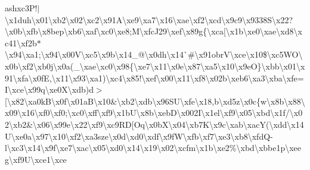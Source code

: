 \begin{DoxyCompactItemize}
ash{}xc3\+P!$\vert$\textbackslash{}x1duh\textbackslash{}x01\textbackslash{}xb2\textbackslash{}x02\textbackslash{}xc2\textbackslash{}x91\+A\textbackslash{}xe9\textbackslash{}xa7\textbackslash{}x16\textbackslash{}xae\textquotesingle{}\textbackslash{}xf2\textbackslash{}xcd\textbackslash{}x9c9\textbackslash{}x9338\+S\textbackslash{}x22?\textbackslash{}x0b\textbackslash{}xfb\textbackslash{}x8bep\textbackslash{}xb6\textbackslash{}xaf\textbackslash{}xc0\textbackslash{}xe8;\+M\textbackslash{}xfc\+J29\textbackslash{}xef\textbackslash{}x89g\{\textbackslash{}xca\mbox{[}\textbackslash{}x1b\textbackslash{}xe0\textbackslash{}xae\textbackslash{}xd8\textbackslash{}xc41\textbackslash{}xf2b$\ast$\textbackslash{}x94\textbackslash{}xa1;\textbackslash{}x94\textbackslash{}x00\+V\textbackslash{}xc5\textbackslash{}x9b\textbackslash{}x14\+\_\+@\textbackslash{}x0dh\textbackslash{}x14\`{}\#\textbackslash{}x91obr\+V\textbackslash{}xce\textbackslash{}x10\$\textbackslash{}xc5\+W\+O\textbackslash{}x0b\textbackslash{}xf2\textbackslash{}xb0j\textbackslash{}x0a(\+\_\+\textbackslash{}xae\textbackslash{}xc0\textbackslash{}x98\{\textbackslash{}xe7\textbackslash{}x11\textbackslash{}x0e\textbackslash{}x87\textbackslash{}xa5\textbackslash{}x10\textbackslash{}x9e\+O\}\textbackslash{}xbb\textbackslash{}x01\textbackslash{}x91\textbackslash{}xfa\textbackslash{}x0f\+E,\textbackslash{}x11\textbackslash{}x93\textbackslash{}xa1)\textbackslash{}xc4\textbackslash{}x85!\textbackslash{}xef\textbackslash{}x00\textbackslash{}x11\textbackslash{}xf8\textbackslash{}x02b\textbackslash{}xeb6\textbackslash{}xa3\textbackslash{}xba\textbackslash{}xfe=\+I\textbackslash{}xce\textbackslash{}x99q\textbackslash{}xe0\+X\textbackslash{}xdb)d$>$\mbox{[}\textbackslash{}x82\textbackslash{}xa0k\+B\textbackslash{}x0f\textbackslash{}x01a\+B\textbackslash{}x10\&\textbackslash{}xb2\textbackslash{}xdb\textbackslash{}x96\+S\+U\textbackslash{}xfe\textbackslash{}x18,b\textbackslash{}xd5z\textbackslash{}x0c\{w\textbackslash{}x8b\textbackslash{}x88\textbackslash{}x09\textbackslash{}x16\textbackslash{}xf0\textbackslash{}xf0;\textbackslash{}xc0\textbackslash{}xff\textbackslash{}xf9\textbackslash{}x1b\+U\textbackslash{}x8b\textbackslash{}xeb\+D\textbackslash{}x002\+I\textbackslash{}x1el\textbackslash{}xf9\textbackslash{}x05\textbackslash{}xbd\textbackslash{}x1f/\textbackslash{}x02\textbackslash{}xb2\&\textbackslash{}x06\textbackslash{}x99e\textbackslash{}x22\textbackslash{}xf9\textbackslash{}xc9\+R\+D\mbox{[}\+Oq\textbackslash{}x0b\+X\textbackslash{}x04\textbackslash{}xb7\+K\textbackslash{}x9c\textbackslash{}xab\textbackslash{}xac\+Y(\textbackslash{}xdd\textbackslash{}x14\+U\textbackslash{}xe0a\textbackslash{}x97\textbackslash{}x10\textbackslash{}xf2\textbackslash{}xa3sze\textbackslash{}x0d\textbackslash{}xd0\textbackslash{}xdf\textquotesingle{}\textbackslash{}x9f\+W\textbackslash{}xfb\textbackslash{}xf7\textbackslash{}xe3\textbackslash{}xb8\textbackslash{}xfd\+Q-\/l\textbackslash{}xc3\textbackslash{}x14\textbackslash{}x9f\textbackslash{}xe7\textbackslash{}xac\textbackslash{}x05\textbackslash{}xd0\textbackslash{}x14\textbackslash{}x19\textbackslash{}x02\textbackslash{}xcfm\textbackslash{}x1b\textbackslash{}xe2\%\textbackslash{}xbd\textbackslash{}xbbe1p\textbackslash{}xeeg\textbackslash{}xf9\+U\textbackslash{}xce1\textbackslash{}xce\+
\end{DoxyCompactItemize}
